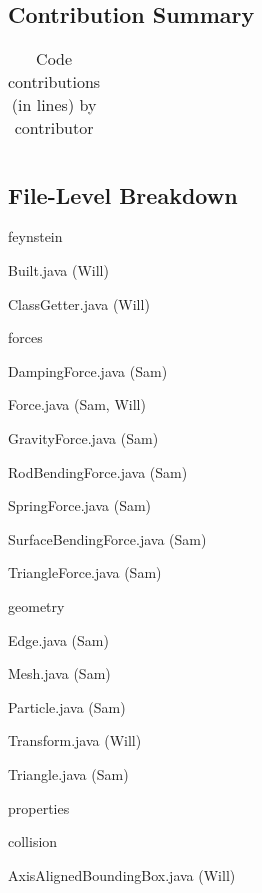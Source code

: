\subsection{Contribution Summary}
\begin{table}[h]
  \centering
  \begin{tabular}{cl}
    
  \end{tabular}
  \caption{Code contributions (in lines) by contributor}
  \label{tab:contrib}
\end{table}

\subsection{File-Level Breakdown}
\begin{description}
\item feynstein
  \begin{description}
  \item Built.java (Will)
  \item ClassGetter.java (Will)
  \item forces
    \begin{description}
    \item DampingForce.java (Sam)
    \item Force.java (Sam, Will)
    \item GravityForce.java (Sam)
    \item RodBendingForce.java (Sam)
    \item SpringForce.java (Sam)
    \item SurfaceBendingForce.java (Sam)
    \item TriangleForce.java (Sam)
    \end{description}
  \item geometry
    \begin{description}
    \item Edge.java (Sam)
    \item Mesh.java (Sam) 
    \item Particle.java (Sam)
    \item Transform.java (Will)
    \item Triangle.java (Sam)
    \end{description}
  \item properties
    \begin{description}
    \item collision
      \begin{description}
      \item AxisAlignedBoundingBox.java (Will) 

\end{description}
\end{description}
\end{description}
\end{description}
